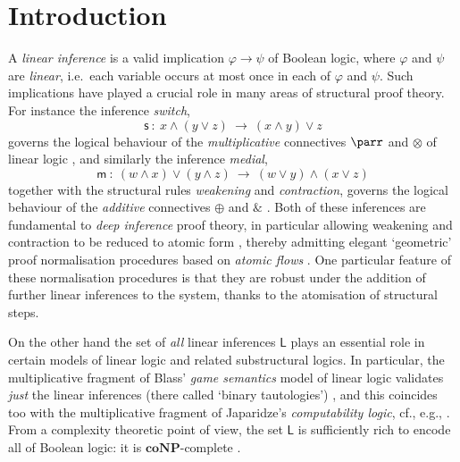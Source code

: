 \documentclass[a4paper, UKenglish, cleveref]{lipics-v2021}
\renewcommand{\phi}{\varphi}
\newcommand{\NP}{\mathbf{NP}}
\newcommand{\co}{\mathbf{co}}
\newcommand{\coNP}{\co\NP}
\newcommand{\infers}{\rightarrow}
\newcommand{\Lin}{\mathsf L}
\newcommand{\m}{\ensuremath{\mathsf{m}}}
\newcommand{\s}{\ensuremath{\mathsf{s}}}
\begin{document}
\section{Introduction}
\label{sec:introduction}
A \emph{linear inference} is a valid implication $\phi \infers \psi$ of Boolean logic, where $\phi$ and $\psi$ are \emph{linear}, i.e.\ each variable occurs at most once in each of $\phi$ and $\psi$.
Such implications have played a crucial role in many areas of structural proof theory.
For instance the inference \emph{switch},
\[
\s \ : \
x \land (y \lor z)
\ \infers \
(x \land y) \lor z
\]
governs the logical behaviour of the \emph{multiplicative} connectives $\parr$ and $\otimes$ of linear logic \cite{Gir87:linear-logic},
and similarly the inference \emph{medial},
\[
\m \ : \
(w \land x) \lor (y \land z)
\ \infers \
(w \lor y) \land (x \lor z)
\]
together with the structural rules \emph{weakening} and \emph{contraction}, governs the logical behaviour of the \emph{additive} connectives $\oplus$ and $\&$ \cite{Str02:lin-log-loc-sys,Str03:phd-thesis}.
Both of these inferences are fundamental to \emph{deep inference} proof theory, in particular allowing weakening and contraction to be reduced to atomic form \cite{BruTiu01:class-log-loc-sys,Bru03:phd-thesis}, thereby admitting elegant `geometric' proof normalisation procedures based on \emph{atomic flows} \cite{GugGun08:norm-contr-di-at-fl,Gun09:phd-thesis}.
One particular feature of these normalisation procedures is that they are robust under the addition of further linear inferences to the system, thanks to the atomisation of structural steps.

On the other hand the set of \emph{all} linear inferences $\Lin$ plays an essential role in certain {models} of linear logic and related substructural logics.
In particular, the multiplicative fragment of Blass' \emph{game semantics} model of linear logic validates \emph{just} the linear inferences (there called `binary tautologies') \cite{Bla92:game-semantics-ll}, and this coincides too with the multiplicative fragment of Japaridze's \emph{computability logic}, cf., e.g., \cite{Jap05:intro-to-cirquent-calc}.
From a complexity theoretic point of view, the set $\Lin$ is sufficiently rich to encode all of Boolean logic: it is $\coNP$-complete \cite{Str12:ext-wo-cut,DasStr16:no-compl-lin-sys}.
\end{document}

